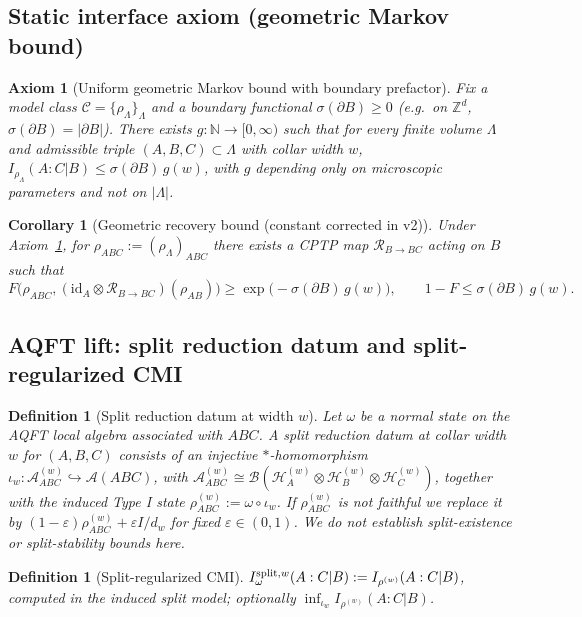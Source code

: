 \documentclass[11pt]{article}
\newtheorem{corollary}[theorem]{Corollary}
\newtheorem{definition}[theorem]{Definition}
\newtheorem{axiom}[theorem]{Axiom}
\theoremstyle{remark}
\begin{document}
\subsection{Static interface axiom (geometric Markov bound)}
\begin{axiom}[Uniform geometric Markov bound with boundary prefactor]
\label{ax:markov}
Fix a model class $\mathcal{C} = \{\rho_\Lambda\}_\Lambda$ and a boundary
functional $\sigma(\partial B) \ge 0$ (e.g.\ on $\mathbb{Z}^d$,
$\sigma(\partial B) = |\partial B|$). There exists
$g : \mathbb{N} \to [0,\infty)$ such that for every finite volume $\Lambda$
and admissible triple $(A,B,C) \subset \Lambda$ with collar width $w$,
$I_{\rho_\Lambda}(A:C|B) \le \sigma(\partial B)\, g(w)$, with $g$ depending
only on microscopic parameters and not on $|\Lambda|$.
\end{axiom}

\begin{corollary}[Geometric recovery bound (constant corrected in v2)]
\label{cor:georec}
Under Axiom~\ref{ax:markov}, for $\rho_{ABC} := (\rho_\Lambda)_{ABC}$ there
exists a CPTP map $\mathcal{R}_{B\to BC}$ acting on $B$ such that
\[
F\bigl(\rho_{ABC}, (\mathrm{id}_A \otimes \mathcal{R}_{B\to BC})
(\rho_{AB})\bigr) \ge \exp\bigl(-\sigma(\partial B)\, g(w)\bigr),
\qquad
1 - F \le \sigma(\partial B)\, g(w).
\]
\end{corollary}

\subsection{AQFT lift: split reduction datum and split-regularized CMI}
\begin{definition}[Split reduction datum at width $w$]
Let $\omega$ be a normal state on the AQFT local algebra associated with
$ABC$. A split reduction datum at collar width $w$ for $(A,B,C)$ consists
of an injective $*$-homomorphism $\iota_w : \mathcal{A}^{(w)}_{ABC}
\hookrightarrow \mathcal{A}(ABC)$, with $\mathcal{A}^{(w)}_{ABC} \cong
\mathcal{B}(\mathcal{H}^{(w)}_A \otimes \mathcal{H}^{(w)}_B \otimes
\mathcal{H}^{(w)}_C)$, together with the induced Type I state
$\rho^{(w)}_{ABC} := \omega \circ \iota_w$. If $\rho^{(w)}_{ABC}$ is not
faithful we replace it by $(1-\varepsilon)\rho^{(w)}_{ABC} +
\varepsilon I/d_w$ for fixed $\varepsilon \in (0,1)$. We do not establish
split-existence or split-stability bounds here.
\end{definition}

\begin{definition}[Split-regularized CMI]
$I_\omega^{{\rm split},w}(A:C|B) := I_{\rho^{(w)}}(A:C|B)$, computed in the
induced split model; optionally
$\inf_{\iota_w} I_{\rho^{(w)}}(A:C|B)$.
\end{definition}
\end{document}
